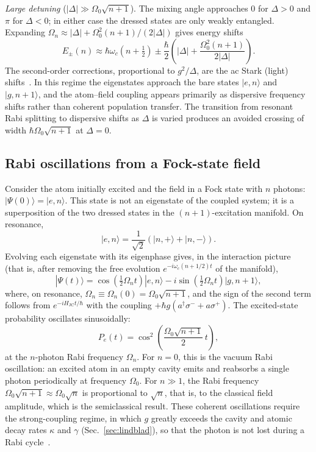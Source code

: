 \documentclass[%
 reprint,
 amsmath,amssymb,
 aps,
 floatfix,
]{revtex4-2}
\begin{document}
\textit{Large detuning} ($|\Delta| \gg \Omega_0\sqrt{n+1}$). The mixing angle approaches 0 for $\Delta > 0$ and $\pi$ for $\Delta < 0$; in either case the dressed states are only weakly entangled. Expanding $\Omega_n \approx |\Delta| + \Omega_0^2(n+1)/(2|\Delta|)$ gives energy shifts
\begin{equation}
E_\pm(n) \approx \hbar\omega_c\left(n + \tfrac{1}{2}\right) \pm \frac{\hbar}{2}\left(|\Delta| + \frac{\Omega_0^2(n+1)}{2|\Delta|}\right).
\end{equation}
The second-order corrections, proportional to $g^2/\Delta$, are the ac Stark (light) shifts~\cite{haroche2006}. In this regime the eigenstates approach the bare states $|e,n\rangle$ and $|g,n{+}1\rangle$, and the atom--field coupling appears primarily as dispersive frequency shifts rather than coherent population transfer. The transition from resonant Rabi splitting to dispersive shifts as $\Delta$ is varied produces an avoided crossing of width $\hbar\Omega_0\sqrt{n+1}$ at $\Delta = 0$.


\subsection{Rabi oscillations from a Fock-state field}
\label{sec:rabi_fock}

Consider the atom initially excited and the field in a Fock state with $n$ photons: $|\Psi(0)\rangle = |e, n\rangle$. This state is not an eigenstate of the coupled system; it is a superposition of the two dressed states in the $(n{+}1)$-excitation manifold. On resonance,
\begin{equation}
|e, n\rangle = \frac{1}{\sqrt{2}}\left(|n,+\rangle + |n,-\rangle\right).
\end{equation}
Evolving each eigenstate with its eigenphase gives, in the interaction picture (that is, after removing the free evolution $e^{-i\omega_c(n+1/2)t}$ of the manifold),
\begin{equation}
|\Psi(t)\rangle = \cos\!\left(\tfrac{1}{2}\Omega_n t\right)|e,n\rangle - i\sin\!\left(\tfrac{1}{2}\Omega_n t\right)|g,n{+}1\rangle,
\label{eq:rabi_evolution}
\end{equation}
where, on resonance, $\Omega_n \equiv \Omega_n(0) = \Omega_0\sqrt{n+1}$, and the sign of the second term follows from $e^{-iH_{\text{JC}}t/\hbar}$ with the coupling $+\hbar g(a^\dagger\sigma^- + a\sigma^+)$. The excited-state probability oscillates sinusoidally:
\begin{equation}
P_e(t) = \cos^2\!\left(\frac{\Omega_0\sqrt{n+1}}{2}\,t\right),
\label{eq:pe_fock}
\end{equation}
at the $n$-photon Rabi frequency $\Omega_n$. For $n = 0$, this is the vacuum Rabi oscillation: an excited atom in an empty cavity emits and reabsorbs a single photon periodically at frequency $\Omega_0$. For $n \gg 1$, the Rabi frequency $\Omega_0\sqrt{n+1} \approx \Omega_0\sqrt{n}$ is proportional to $\sqrt{n}$, that is, to the classical field amplitude, which is the semiclassical result. These coherent oscillations require the strong-coupling regime, in which $g$ greatly exceeds the cavity and atomic decay rates $\kappa$ and $\gamma$ (Sec.~\ref{sec:lindblad}), so that the photon is not lost during a Rabi cycle~\cite{haroche2006}.
\end{document}
